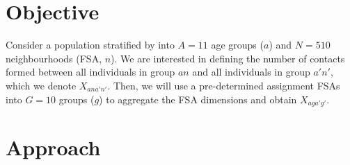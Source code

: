 \documentclass{article}
\begin{document}
  \maketitle
  \section{Objective}\label{s:obj}
  Consider a population stratified by into
  $A=11$ age groups ($a$) and $N=510$ neighbourhoods (FSA, $n$).
  We are interested in defining the number of contacts formed between
  all individuals in group $an$ and all individuals in group $a'n'$,
  which we denote $X_{ana'n'}$.
  Then, we will use a pre-determined assignment FSAs into $G=10$ groups ($g$)
  to aggregate the FSA dimensions and obtain $X_{aga'g'}$.
  \section{Approach}\label{s:methods}
\end{document}
